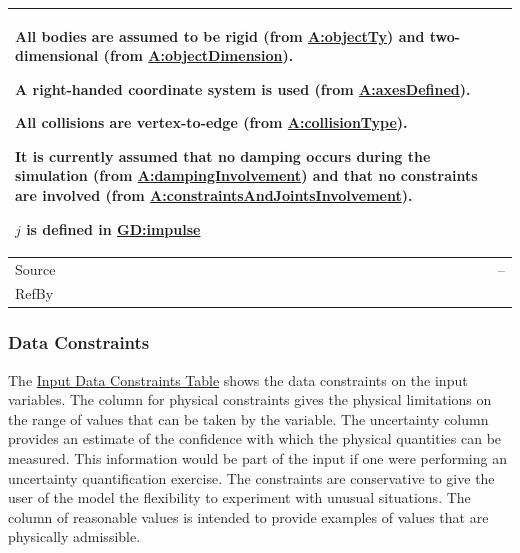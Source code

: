\documentclass[12pt]{article}
\begin{document}
\begin{minipage}{\textwidth}
\begin{tabular}{>{\raggedright}p{}>{\raggedright\arraybackslash}p{}}
        All bodies are assumed to be rigid (from \hyperref[assumpOT]{A:objectTy}) and two-dimensional (from \hyperref[assumpOD]{A:objectDimension}).
        
        A right-handed coordinate system is used (from \hyperref[assumpAD]{A:axesDefined}).
        
        All collisions are vertex-to-edge (from \hyperref[assumpCT]{A:collisionType}).
        
        It is currently assumed that no damping occurs during the simulation (from \hyperref[assumpDI]{A:dampingInvolvement}) and that no constraints are involved (from \hyperref[assumpCAJI]{A:constraintsAndJointsInvolvement}).
        
        $j$ is defined in \hyperref[GD:impulse]{GD:impulse}
        
\\ \midrule
Source & --
         
\\ \midrule
RefBy & 
\\ \bottomrule
\end{tabular}
\end{minipage}

\subsubsection{Data Constraints}
\label{Sec:DataConstraints}
The \hyperref[Table:InDataConstraints]{Input Data Constraints Table} shows the data constraints on the input variables. The column for physical constraints gives the physical limitations on the range of values that can be taken by the variable. The uncertainty column provides an estimate of the confidence with which the physical quantities can be measured. This information would be part of the input if one were performing an uncertainty quantification exercise. The constraints are conservative to give the user of the model the flexibility to experiment with unusual situations. The column of reasonable values is intended to provide examples of values that are physically admissible.
\end{document}
